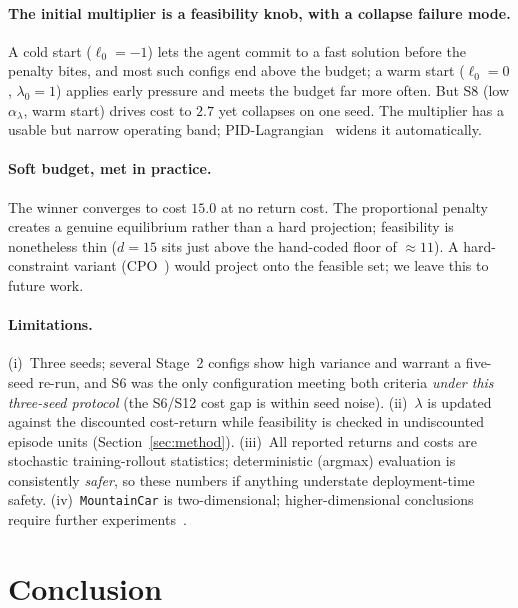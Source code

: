 \documentclass{article}
\newcommand{\secref}[1]{Section~\ref{#1}}
\begin{document}
\paragraph{The initial multiplier is a feasibility knob, with a collapse failure mode.}
A cold start ($\ell_0{=}{-1}$) lets the agent commit to a fast solution before the penalty bites, and most such configs end above the budget; a warm start ($\ell_0{=}0$, $\lambda_0{=}1$) applies early pressure and meets the budget far more often. But S8 (low $\alpha_\lambda$, warm start) drives cost to $2.7$ yet collapses on one seed. The multiplier has a usable but narrow operating band; PID-Lagrangian~\citep{stooke2020responsive} widens it automatically.

\paragraph{Soft budget, met in practice.}
The winner converges to cost $15.0$ at no return cost. The proportional penalty creates a genuine equilibrium rather than a hard projection; feasibility is nonetheless thin ($d{=}15$ sits just above the hand-coded floor of $\approx 11$). A hard-constraint variant (CPO~\citep{achiam2017cpo}) would project onto the feasible set; we leave this to future work.

\paragraph{Limitations.}
(i)~Three seeds; several Stage~2 configs show high variance and warrant a five-seed re-run, and S6 was the only configuration meeting both criteria \emph{under this three-seed protocol} (the S6/S12 cost gap is within seed noise).
(ii)~$\lambda$ is updated against the discounted cost-return while feasibility is checked in undiscounted episode units (\secref{sec:method}).
(iii)~All reported returns and costs are stochastic training-rollout statistics; deterministic (argmax) evaluation is consistently \emph{safer}, so these numbers if anything understate deployment-time safety.
(iv)~\texttt{MountainCar} is two-dimensional; higher-dimensional conclusions require further experiments~\citep{ray2019benchmarking}.


\section{Conclusion}
\label{sec:conclusion}
\end{document}

